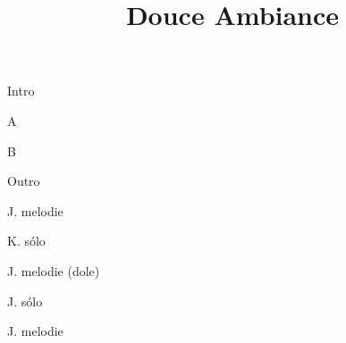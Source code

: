 \documentclass[timestamp]{jazzgrid}
\title{\textbf{Douce Ambiance}}
\begin{document}
\maketitle
\begin{musicsection}{Intro}
\barline
	{\barfour{}
		{}
		{}
		{}
		{}
	}
	{\barfour{}
		{}
		{}
		{}
		{}
	}
	{\barfour{}
		{}
		{}
		{}
		{}
	}
	{\barfour{}
		{}
		{}
		{}
		{}
	}
\barline
	{\barfour{}
		{}
		{}
		{}
		{}
	}
	{\barfour{}
		{}
		{}
		{}
		{}
	}
	{\barfour{}
		{}
		{}
		{}
		{}
	}
	{\barfour{}
		{}
		{}
		{}
		{}
	}
\end{musicsection}

\begin{musicsection}{A}
\barline
	{\barfour{}
		{}
		{}
		{}
		{}
	}
	{\barfour{}
		{}
		{}
		{}
		{}
	}
	{\barfour{}
		{}
		{}
		{}
		{}
	}
	{\barfour{}
		{}
		{}
		{}
		{}
	}
\barline
	{\barfour{}
		{}
		{}
		{}
		{}
	}
	{\barfour{}
		{}
		{}
		{}
		{}
	}
	{
		{}
		{}
		{}
		{}
	}
	{\barfour{}
		{}
		{}
		{}
		{}
	}
\barlinetwo{}
	{
		{}
		{}
		{}
		{}
	}
	{\barfour{}
		{}
		{}
		{}
		{}
	}
\end{musicsection}
\begin{musicsection}{B}
\barline
	{\barfour{}
		{}
		{}
		{}
		{}
	}
	{\barfour{}
		{}
		{}
		{}
		{}
	}
	{\barfour{}
		{}
		{}
		{}
		{}
	}
	{\barfour{}
		{}
		{}
		{}
		{}
	}
\barline
	{\barfour{}
		{}
		{}
		{}
		{}
	}
	{\barfour{}
		{}
		{}
		{}
		{}
	}
	{\barfour{}
		{}
		{}
		{}
		{}
	}
	{\barfour{}
		{}
		{}
		{}
		{}
	}
\end{musicsection}
\begin{musicsection}{Outro}
\barline
	{\barfour{}
		{}
		{}
		{}
		{}
	}
	{\barfour{}
		{}
		{}
		{}
		{}
	}
	{\barfour{}
		{}
		{}
		{}
		{}
	}
	{\barfour{}
		{}
		{}
		{}
		{}
	}
\barline
	{\barfour{}
		{}
		{}
		{}
		{}
	}
	{\barfour{}
		{}
		{}
		{}
		{}
	}
	{\barfour{}
		{}
		{}
		{}
		{}
	}
	{\barfour{}
		{}
		{}
		{}
		{}
	}
\end{musicsection}

\begin{multicols*}{2}
\begin{description}[noitemsep,align=right,labelwidth=\widthof{\scriptsize\bfseries{AABA}}]
	\scriptsize
	\item [Intro]
	\item [AABA] J. melodie
	\item [AA\phantom{BA}] K. sólo
	\item [BA] J. melodie (dole)
	\item [AABA] J. sólo
	\item [AABA] J. melodie
	\item [Outro]
\end{description}
\end{multicols*}
\end{document}
